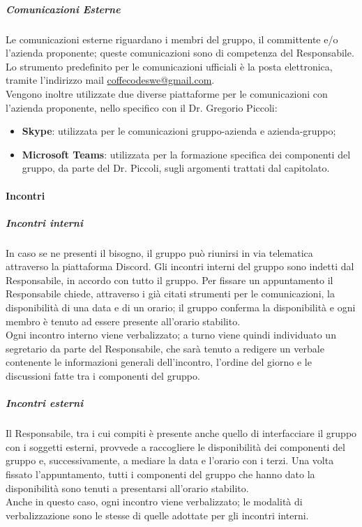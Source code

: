 \documentclass[../norme-di-progetto.tex]{subfiles}
\begin{document}
\subparagraph{Comunicazioni Esterne}
Le comunicazioni esterne riguardano i membri del gruppo, il committente e/o l'azienda proponente; queste comunicazioni sono di competenza del Responsabile. Lo strumento predefinito per le comunicazioni ufficiali è la posta elettronica, tramite l'indirizzo mail \href{coffecodeswe@gmail.com}{coffecodeswe@gmail.com}. \\
Vengono inoltre utilizzate due diverse piattaforme per le comunicazioni con l'azienda proponente, nello specifico con il Dr. Gregorio Piccoli:
\begin{itemize}
  \item \textbf{Skype}: utilizzata per le comunicazioni gruppo-azienda e azienda-gruppo;
  \item \textbf{Microsoft Teams}: utilizzata per la formazione specifica dei componenti del gruppo, da parte del Dr. Piccoli, sugli argomenti trattati dal capitolato.
\end{itemize}

\paragraph{Incontri}
\subparagraph{Incontri interni}
In caso se ne presenti il bisogno, il gruppo può riunirsi in via telematica attraverso la piattaforma Discord. Gli incontri interni del gruppo sono indetti dal Responsabile, in accordo con tutto il gruppo. Per fissare un appuntamento il Responsabile chiede, attraverso i già citati strumenti per le comunicazioni, la disponibilità di una data e di un orario; il gruppo conferma la disponibilità e ogni membro è tenuto ad essere presente all'orario stabilito. \\
Ogni incontro interno viene verbalizzato; a turno viene quindi individuato un segretario da parte del Responsabile, che sarà tenuto a redigere un verbale contenente le informazioni generali dell'incontro, l'ordine del giorno e le discussioni fatte tra i componenti del gruppo.

\subparagraph{Incontri esterni}
Il Responsabile, tra i cui compiti è presente anche quello di interfacciare il gruppo con i soggetti esterni, provvede a raccogliere le disponibilità dei componenti del gruppo e, successivamente, a mediare la data e l'orario con i terzi. Una volta fissato l'appuntamento, tutti i componenti del gruppo che hanno dato la disponibilità sono tenuti a presentarsi all'orario stabilito. \\
Anche in questo caso, ogni incontro viene verbalizzato; le modalità di verbalizzazione sono le stesse di quelle adottate per gli incontri interni.
\end{document}
